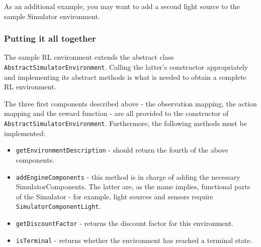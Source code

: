 \documentclass[12pt]{article}
\newcommand{\code}[1]{\texttt{#1}}
\begin{document}
As an additional example, you may want to add a second light source to the
sample Simulator environment.

\subsubsection{Putting it all together}

The sample RL environment extends the abstract class 
\code{AbstractSimulatorEnvironment}. Calling the latter's constructor 
appropriately and implementing its abstract methods is what is needed
to obtain a complete RL environment.

The three first components described above - the observation mapping, the
action mapping and the reward function - are all provided to the 
constructor of \code{AbstractSimulatorEnvironment}. Furthermore, the
following methods must be implemented:

\begin{itemize}
\item{\code{getEnvironmentDescription} - should return the fourth of the above components.}
\item{\code{addEngineComponents} - this method is in charge of adding the necessary SimulatorComponents. The latter are, as the name implies, functional parts of the Simulator - for example, light sources and sensors require \code{SimulatorComponentLight}.}
\item{\code{getDiscountFactor} - returns the discount factor for this environment.}
\item{\code{isTerminal} - returns whether the environment has reached a terminal state.}
\end{itemize}
\end{document}
